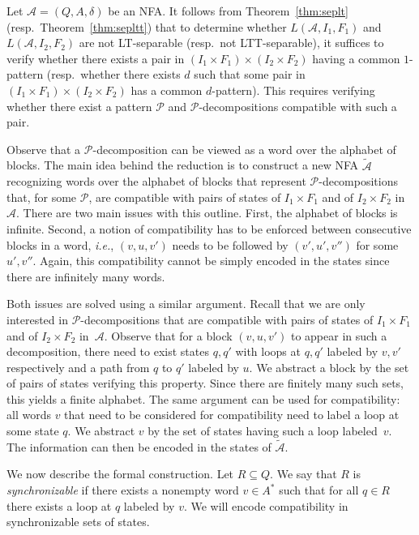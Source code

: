 \documentclass{LMCS}
\newcommand\As{\ensuremath{\mathcal{A}}\xspace}
\newcommand\Ps{\ensuremath{\mathcal{P}}\xspace}
\newcommand{\lt}{\textup{LT}\xspace}
\newcommand{\ltt}{\textup{LTT}\xspace}
\newcommand\decop[1]{\ensuremath{#1}-decomposition\xspace}
\newcommand\decops[1]{\ensuremath{#1}-decompositions\xspace}
\newcommand\pfsdecomp{\decop{\Ps}}
\newcommand\pfsdecomps{\decops{\Ps}}
\theoremstyle{plain}
\begin{document}
Let $\As = (Q,A,\delta)$ be an NFA. It follows from Theorem~\ref{thm:seplt}
(resp.~Theorem~\ref{thm:sepltt}) that to determine whether $L(\As,I_1,F_1)$
and $L(\As,I_2,F_2)$ are not \lt-separable (resp.~not \ltt-separable), it
suffices to verify whether there exists a pair in $(I_1\times F_1)
\times(I_2\times F_2)$ having a common $1$-pattern (resp.~whether there exists
$d$ such that some pair in $(I_1\times F_1) \times(I_2\times F_2)$ has a
common $d$-pattern). This requires verifying whether there exist a pattern \Ps
and \pfsdecomps compatible with such a pair.

Observe that a \pfsdecomp can be viewed as a word over the alphabet of
blocks. The main idea behind the reduction is to construct a new NFA
$\widetilde{\As}$ recognizing words over the
alphabet of blocks that represent \pfsdecomps that, for some \Ps, are compatible
with pairs of states of $I_1\times F_1$ and of $I_2\times F_2$ in
$\As$. There are two main issues with
this outline. First, the alphabet of blocks is infinite. Second, a
notion of compatibility has to be enforced between consecutive blocks
in a word, \emph{i.e.}, $(v,u,v')$ needs to be followed by $(v',u',v'')$ for
some $u',v''$. Again, this compatibility cannot be simply encoded in
the states since there are infinitely many words.

Both issues are solved using a similar argument. Recall that we are
only interested in \pfsdecomps that are compatible with pairs of states of $I_1\times F_1$  and of $I_2\times F_2$ in~$\As$. Observe that for a block $(v,u,v')$ to appear in such a
decomposition, there need to exist states $q,q'$ with loops at $q,q'$
labeled by $v,v'$ respectively and a path from $q$ to $q'$ labeled by
$u$. We abstract a block by the set of pairs of states verifying this
property. Since there are finitely many such sets, this yields a
finite alphabet. The same argument can be used for compatibility: all
words $v$ that need to be considered for compatibility need to label a
loop at some state $q$. We abstract $v$ by the set of states having
such a loop labeled~$v$. The information can then be encoded in the
states of $\widetilde{\As}$.

\smallskip We now describe the formal construction. Let $R \subseteq
Q$. We say that $R$ is \emph{synchronizable} if there
exists a nonempty word $v \in A^*$ such that for all $q \in R$ there exists a loop
at $q$ labeled by $v$. We will encode compatibility in
synchronizable sets of states.
\end{document}
